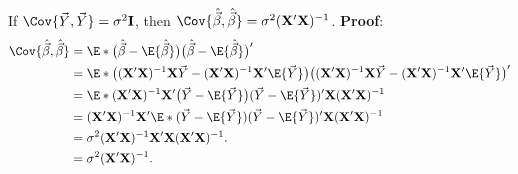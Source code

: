 \begin{Theorem}{}{}
    If $ \Cov{\Vector{Y},\Vector{Y}}=\sigma^2 \Matrix{I} $, then
    $ \Cov{\hat{\Vector{\beta}},\hat{\Vector{\beta}}}=\sigma^2(\Matrix{X}'\Matrix{X})^{-1} $.
    \tcblower{}
    \textbf{Proof}:
    \begin{align*}
        \Cov{\hat{\Vector{\beta}},\hat{\Vector{\beta}}}
         & =\E*{\bigl(\hat{\Vector{\beta}}-\E{\hat{\Vector{\beta}}}\bigr)\bigl(\hat{\Vector{\beta}}-\E{\hat{\Vector{\beta}}}\bigr)'}                                                                                                                   \\
         & =\E*{\bigl((\Matrix{X}'\Matrix{X})^{-1}\Matrix{X}\Vector{Y}-(\Matrix{X}'\Matrix{X})^{-1}\Matrix{X}'\E{\Vector{Y}}\bigr)\bigl((\Matrix{X}'\Matrix{X})^{-1}\Matrix{X}\Vector{Y}-(\Matrix{X}'\Matrix{X})^{-1}\Matrix{X}'\E{\Vector{Y}}\bigr)'} \\
         & =\E*{(\Matrix{X}'\Matrix{X})^{-1}\Matrix{X}'\bigl(\Vector{Y}-\E{\Vector{Y}}\bigr)(\Vector{Y}-\E{\Vector{Y}})'\Matrix{X}(\Matrix{X}'\Matrix{X})^{-1}}                                                                                        \\
         & =(\Matrix{X}'\Matrix{X})^{-1}\Matrix{X}'\E*{(\Vector{Y}-\E{\Vector{Y}})(\Vector{Y}-\E{\Vector{Y}})'}\Matrix{X}(\Matrix{X}'\Matrix{X})^{-1}                                                                                                  \\
         & =\sigma^2 (\Matrix{X}'\Matrix{X})^{-1}\Matrix{X}'\Matrix{X}(\Matrix{X}'\Matrix{X})^{-1}.                                                                                                                                                    \\
         & =\sigma^2  (\Matrix{X}'\Matrix{X})^{-1}.
    \end{align*}
\end{Theorem}
